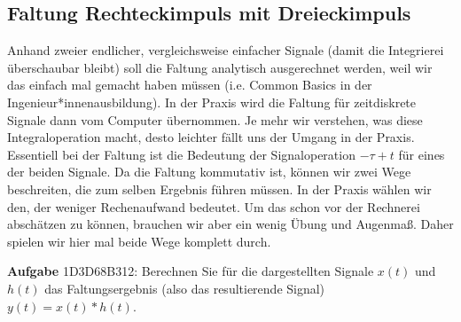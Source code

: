 








\newpage
\subsection{Faltung Rechteckimpuls mit Dreieckimpuls}
\label{sec:1D3D68B312}
\begin{Ziel}
Anhand zweier endlicher, vergleichsweise einfacher Signale (damit die Integrierei
überschaubar bleibt) soll die Faltung analytisch ausgerechnet werden, weil
wir das einfach mal gemacht haben müssen (i.e. Common Basics in der
Ingenieur*innenausbildung).
%
In der Praxis wird die Faltung für zeitdiskrete Signale dann vom Computer
übernommen.
%
Je mehr wir verstehen, was diese Integraloperation macht, desto leichter fällt
uns der Umgang in der Praxis.
%
Essentiell bei der Faltung ist die Bedeutung der Signaloperation $-\tau+t$
für eines der beiden Signale.
%
Da die Faltung kommutativ ist, können wir zwei Wege beschreiten, die zum selben
Ergebnis führen müssen. In der Praxis wählen wir den, der weniger Rechenaufwand bedeutet.
Um das schon vor der Rechnerei abschätzen zu können, brauchen wir aber ein wenig
Übung und Augenmaß. Daher spielen wir hier mal beide Wege komplett durch.
\end{Ziel}
%
\textbf{Aufgabe} {\tiny 1D3D68B312}: Berechnen Sie für die dargestellten Signale
$x(t)$ und $h(t)$ das Faltungsergebnis (also das resultierende Signal)
$y(t) = x(t) \ast h(t)$.
%
\begin{center}
\end{center}

